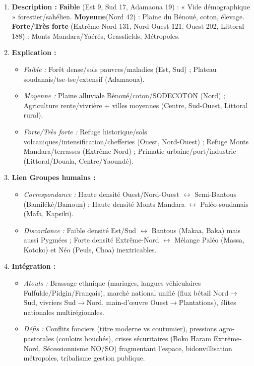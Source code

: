 \documentclass[11pt]{article}
\begin{document}
\begin{corrige}
\begin{enumerate}
    \item \textbf{Description :} \textbf{Faible} (Est 9, Sud 17, Adamaoua 19) : « Vide démographique » forestier/sahélien. \textbf{Moyenne}(Nord 42) : Plaine du Bénoué, coton, élevage. \textbf{Forte/Très forte} (Extrême-Nord 131, Nord-Ouest 121, Ouest 202, Littoral 188) : Monts Mandara/Yaérés, Grassfields, Métropoles.
    \item \textbf{Explication :}
        \begin{itemize}
            \item \textit{Faible :} Forêt dense/sols pauvres/maladies (Est, Sud) ; Plateau soudanais/tse-tse/extensif (Adamaoua).
            \item \textit{Moyenne :} Plaine alluviale Bénoué/coton/SODECOTON (Nord) ; Agriculture rente/vivrière + villes moyennes (Centre, Sud-Ouest, Littoral rural).
            \item \textit{Forte/Très forte :} Refuge historique/sols volcaniques/intensification/chefferies (Ouest, Nord-Ouest) ; Refuge Monts Mandara/terrasses (Extrême-Nord) ; Primatie urbaine/port/industrie (Littoral/Douala, Centre/Yaoundé).
        \end{itemize}
    \item \textbf{Lien Groupes humains :}
        \begin{itemize}
            \item \textit{Correspondance :} Haute densité Ouest/Nord-Ouest $\leftrightarrow$ Semi-Bantous (Bamiléké/Bamoun) ; Haute densité Monts Mandara $\leftrightarrow$ Paléo-soudanais (Mafa, Kapsiki).
            \item \textit{Discordance :} Faible densité Est/Sud $\leftrightarrow$ Bantous (Makaa, Baka) mais aussi Pygmées ; Forte densité Extrême-Nord $\leftrightarrow$ Mélange Paléo (Massa, Kotoko) et Néo (Peuls, Choa) inextricables.
        \end{itemize}
    \item \textbf{Intégration :}
        \begin{itemize}
            \item \textit{Atouts :} Brassage ethnique (mariages, langues véhiculaires Fulfulde/Pidgin/Français), marché national unifié (flux bétail Nord$\rightarrow$Sud, vivriers Sud$\rightarrow$Nord, main-d'œuvre Ouest$\rightarrow$Plantations), élites nationales multirégionales.
            \item \textit{Défis :} Conflits fonciers (titre moderne vs coutumier), pressions agro-pastorales (couloirs bouchés), crises sécuritaires (Boko Haram Extrême-Nord, Sécessionnisme NO/SO) fragmentant l'espace, bidonvillisation métropoles, tribalisme gestion publique.

\end{itemize}
\end{enumerate}
\end{corrige}
\end{document}
